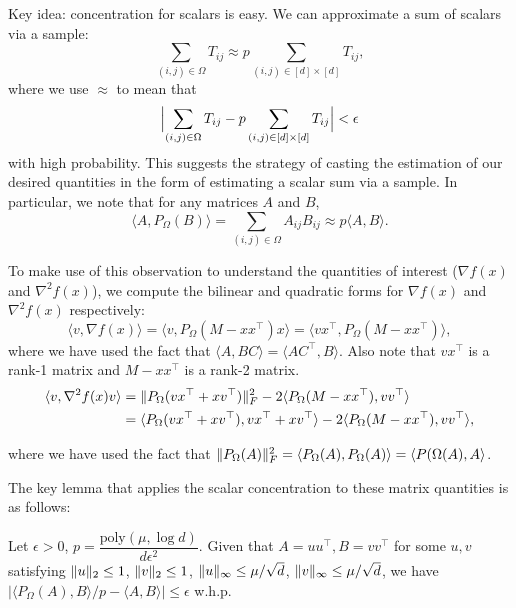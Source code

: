 \begin{remark}
Key idea: concentration for scalars is easy. We can approximate a sum of scalars via a sample:
\begin{equation}
\sum_{(i,j) \in \Omega} T_{ij} \approx p\sum_{(i,j) \in [d]\times[d]} T_{ij},
\end{equation}
where we use $\approx$ to mean that
\begin{equation}
\Bigl| \sum_{(i,j) \in \Omega} T_{ij} - p\sum_{(i,j) \in [d]\times[d]} T_{ij} \Bigr| < \epsilon
\end{equation}
with high probability. This suggests the strategy of casting the estimation of our desired quantities in the form of estimating a scalar sum via a sample. In particular, we note that for any matrices $A$ and $B$,
\begin{equation}
\langle A, P_\Omega(B) \rangle = \sum_{(i,j) \in \Omega} A_{ij}B_{ij} \approx p\langle A, B \rangle.
\end{equation}
\end{remark}

To make use of this observation to understand the quantities of interest ($\nabla f(x)$ and $\nabla^2 f(x)$), we compute the bilinear and quadratic forms for $\nabla f(x)$ and $\nabla^2 f(x)$ respectively:
\begin{equation}
\langle v, \nabla f(x) \rangle = \langle v, P_\Omega(M-xx^\top)x \rangle = \langle vx^\top, P_\Omega(M-xx^\top) \rangle,
\end{equation}
where we have used the fact that $\langle A,BC \rangle = \langle AC^\top,B\rangle$. Also note that $vx^\top$ is a rank-1 matrix and $M-xx^\top$ is a rank-2 matrix.
\begin{align}
\langle v, \nabla^2 f(x) v \rangle &= \|P_\Omega(vx^\top + xv^\top)\|_F^2 - 2\langle P_\Omega(M-xx^\top), vv^\top \rangle \\
&=  \langle P_\Omega(vx^\top + xv^\top), vx^\top + xv^\top \rangle - 2\langle P_\Omega(M-xx^\top), vv^\top \rangle,
\end{align}

where we have used the fact that $\|P_\Omega(A)\|_F^2 = \langle P_\Omega(A), P_\Omega(A)\rangle = \langle P(\Omega(A), A\rangle$.

The key lemma that applies the scalar concentration to these matrix quantities is as follows:

\begin{lemma}
Let $\epsilon>0$, $p = \dfrac{\textrm{poly}(\mu, \log d)}{d\epsilon^2}$. Given that $A = uu^\top, B=vv^\top$ for some $u, v$ satisfying $\|u\|_2 \leq 1$, $\|v\|_2 \leq 1$, $\|u\|_\infty \leq \mu / \sqrt{d}$, $\|v\|_\infty \leq \mu / \sqrt{d}$, we have $|\langle P_\Omega(A), B \rangle/p - \langle A, B\rangle| \leq \epsilon$ w.h.p.
\label{lec11:lem:concentration_lemma}
\end{lemma}

